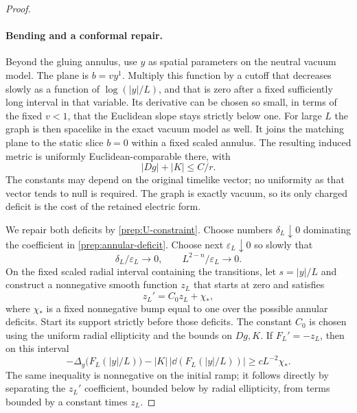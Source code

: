 \begin{proof}
\paragraph{Bending and a conformal repair.}
Beyond the gluing annulus, use $y$ as spatial parameters on the neutral
vacuum model.  The plane is $b=vy^1$.  Multiply this function by a cutoff
that decreases slowly as a function of $\log(|y|/L)$, and that is zero
after a fixed sufficiently long interval in that variable.  Its
derivative can be chosen so small, in terms of the fixed $v<1$, that
the Euclidean slope stays strictly below one.  For large $L$ the graph
is then spacelike in the exact vacuum model as well.  It joins the
matching plane to the static slice $b=0$ within a fixed scaled annulus.
The resulting induced metric is uniformly Euclidean-comparable there,
with
\[
 |Dg|+|K|\leq C/r.
\]
The constants may depend on the original timelike vector; no uniformity
as that vector tends to null is required.  The graph is exactly vacuum,
so its only charged deficit is the cost of the retained electric form.

We repair both deficits by \eqref{prep:U-constraint}.  Choose numbers
$\delta_L\downarrow0$ dominating the coefficient in
\eqref{prep:annular-deficit}.  Choose next $\varepsilon_L\downarrow0$
so slowly that
\[
 \delta_L/\varepsilon_L\longrightarrow0,
 \qquad L^{2-n}/\varepsilon_L\longrightarrow0.
\]
On the fixed scaled radial interval containing the transitions, let
$s=|y|/L$ and construct a nonnegative smooth function $z_L$ that starts
at zero and satisfies
\[
 z_L'=C_0z_L+\chi_*,
\]
where $\chi_*$ is a fixed nonnegative bump equal to one over the
possible annular deficits.  Start its support strictly before those
deficits.  The constant $C_0$ is chosen using the uniform radial
ellipticity and the bounds on $Dg,K$.  If $F_L'=-z_L$, then on this
interval
\[
 -\Delta_g\bigl(F_L(|y|/L)\bigr)
       -|K|\,|\dd(F_L(|y|/L))|
 \geq cL^{-2}\chi_*.
\]
The same inequality is nonnegative on the initial ramp; it follows
directly by separating the $z_L'$ coefficient, bounded below by radial
ellipticity, from terms bounded by a constant times $z_L$.


\end{proof}
